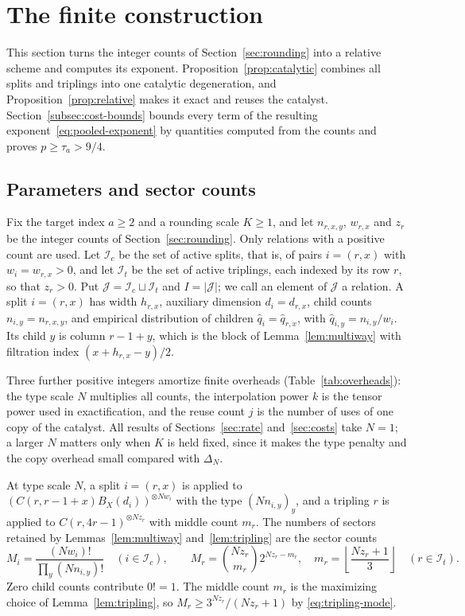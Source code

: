 \section{The finite construction}
\label{sec:extraction}

This section turns the integer counts of Section~\ref{sec:rounding} into a
relative scheme and computes its exponent. Proposition~\ref{prop:catalytic}
combines all splits and triplings into one catalytic degeneration, and
Proposition~\ref{prop:relative} makes it exact and reuses the catalyst.
Section~\ref{subsec:cost-bounds} bounds every term of the resulting
exponent~\eqref{eq:pooled-exponent} by quantities computed from the counts
and proves \(p\ge\tau_a>9/4\).

\subsection{Parameters and sector counts}
\label{subsec:parameters}

Fix the target index \(a\ge2\) and a rounding scale \(K\ge1\), and let
\(n_{r,x,y}\), \(w_{r,x}\) and \(z_r\) be the integer counts of
Section~\ref{sec:rounding}. Only relations with a positive count are used.
Let \(\mathcal I_c\) be the set of active splits, that is, of pairs
\(i=(r,x)\) with \(w_i=w_{r,x}>0\), and let \(\mathcal I_t\) be the set of
active triplings, each indexed by its row \(r\), so that \(z_r>0\). Put
\(\mathcal J=\mathcal I_c\sqcup\mathcal I_t\) and \(I=|\mathcal J|\); we call
an element of \(\mathcal J\) a relation. A split \(i=(r,x)\) has width
\(h_{r,x}\), auxiliary dimension \(d_i=d_{r,x}\), child counts
\(n_{i,y}=n_{r,x,y}\), and empirical distribution of children
\(\hat q_i=\hat q_{r,x}\), with \(\hat q_{i,y}=n_{i,y}/w_i\). Its child
\(y\) is column \(r-1+y\), which is the block of Lemma~\ref{lem:multiway}
with filtration index \((x+h_{r,x}-y)/2\).

Three further positive integers amortize finite overheads
(Table~\ref{tab:overheads}): the type scale \(N\) multiplies all counts,
the interpolation power \(k\) is the tensor power used in exactification,
and the reuse count \(j\) is the number of uses of one copy of the
catalyst. All results of Sections~\ref{sec:rate} and~\ref{sec:costs} take
\(N=1\); a larger \(N\) matters only when \(K\) is held fixed, since it
makes the type penalty and the copy overhead small compared with
\(\Delta_N\).

At type scale \(N\), a split \(i=(r,x)\) is applied to
\((C(r,r-1+x)B_X(d_i))^{\otimes Nw_i}\) with the type
\((Nn_{i,y})_y\), and a tripling \(r\) is applied to
\(C(r,4r-1)^{\otimes Nz_r}\) with middle count \(m_r\). The numbers of
sectors retained by Lemmas~\ref{lem:multiway} and~\ref{lem:tripling} are
the sector counts
\begin{equation}\label{eq:sector-counts}
 M_i=\frac{(Nw_i)!}{\prod_y(Nn_{i,y})!}\quad(i\in\mathcal I_c),
 \qquad
 M_r=\binom{Nz_r}{m_r}2^{Nz_r-m_r},\quad
 m_r=\left\lfloor\frac{Nz_r+1}{3}\right\rfloor
 \quad(r\in\mathcal I_t).
\end{equation}
Zero child counts contribute \(0!=1\). The middle count \(m_r\) is the
maximizing choice of Lemma~\ref{lem:tripling}, so
\(M_r\ge3^{Nz_r}/(Nz_r+1)\) by \eqref{eq:tripling-mode}.

